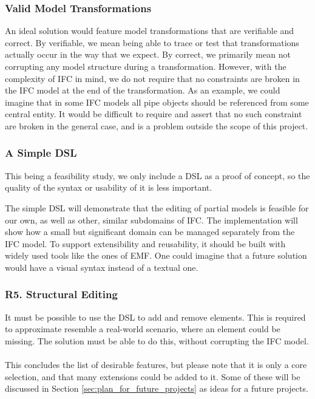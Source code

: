 \subsubsection{Valid Model Transformations}
An ideal solution would feature model transformations that are verifiable and correct. By verifiable, we mean being able to trace or test that transformations actually occur in the way that we expect. By correct, we primarily mean not corrupting any model structure during a transformation.  However, with the complexity of IFC in mind, we do not require that no constraints are broken in the IFC model at the end of the transformation. As an example, we could imagine that in some IFC models all pipe objects should be referenced from some central entity. It would be difficult to require and assert that no such constraint are broken in the general case, and is a problem outside the scope of this project.

\subsubsection{A Simple DSL}
This being a feasibility study, we only include a DSL as a proof of concept, so the quality of the syntax or usability of it is less important.

The simple DSL will demonstrate that the editing of partial models is feasible for our own, as well as other, similar subdomains of IFC. The implementation will show how a small but significant domain can be managed separately from the IFC model. To support extensibility and reusability, it should be built with widely used tools like the ones of EMF.  One could imagine that a future solution would have a visual syntax instead of a textual one.

\subsubsection{R5. Structural Editing}
It must be possible to use the DSL to add and remove elements. This is required to approximate resemble a real-world scenario, where an element could be missing. The solution must be able to do this, without corrupting the IFC model.
\paragraph{}
This concludes the list of desirable features, but please note that it is only a core selection, and that many extensions could be added to it. Some of these will be discussed in Section \ref{sec:plan_for_future_projects} as ideas for a future projects.


